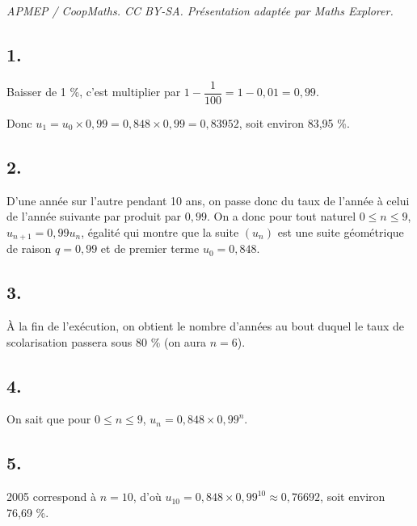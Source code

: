 \documentclass[10pt]{article}
\begin{document}
\noindent\textit{APMEP / CoopMaths. CC BY-SA. Présentation adaptée par Maths Explorer.}\par\medskip
\subsection*{1.}

Baisser de 1 \%, c'est multiplier par \(1 - \dfrac{1}{100} = 1 - 0{,}01 = 0{,}99\).

Donc \( u_1 = u_0 \times 0{,}99 = 0{,}848 \times 0{,}99 = 0{,}83952 \), soit environ 83{,}95 \%.

\subsection*{2.}

D'une année sur l'autre pendant 10 ans, on passe donc du taux de l'année à celui de l'année suivante par produit par \(0{,}99\). On a donc pour tout naturel \( 0 \leqslant n \leqslant 9 \), \( u_{n+1} = 0{,}99 u_n \), égalité qui montre que la suite \( (u_n) \) est une suite géométrique de raison \(q = 0{,}99\) et de premier terme \( u_0 = 0{,}848 \).

\subsection*{3.}

À la fin de l'exécution, on obtient le nombre d'années au bout duquel le taux de scolarisation passera sous 80 \% (on aura \( n = 6 \)).

\subsection*{4.}

On sait que pour \( 0 \leqslant n \leqslant 9 \), \( u_n = 0{,}848 \times 0{,}99^n \).

\subsection*{5.}

2005 correspond à \( n = 10 \), d'où \( u_{10} = 0{,}848 \times 0{,}99^{10} \approx 0{,}76692 \), soit environ 76{,}69 \%.
\end{document}
